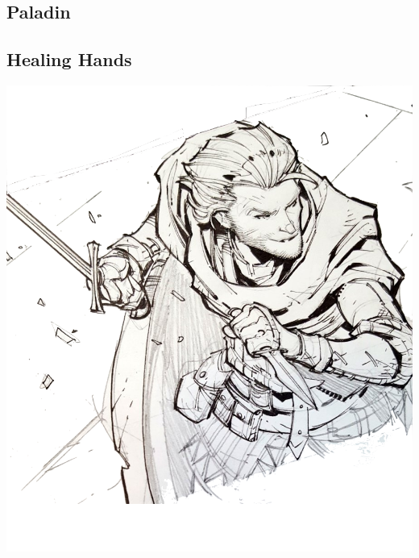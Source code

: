 \begin{multicols*}{2}

\section{Paladin}

\subsection*{Healing Hands}

\begin{Figure}
\centering
\includegraphics[width=\textwidth]{img/trickster.png}
\end{Figure}
    
\end{multicols*}

\clearpage






    


